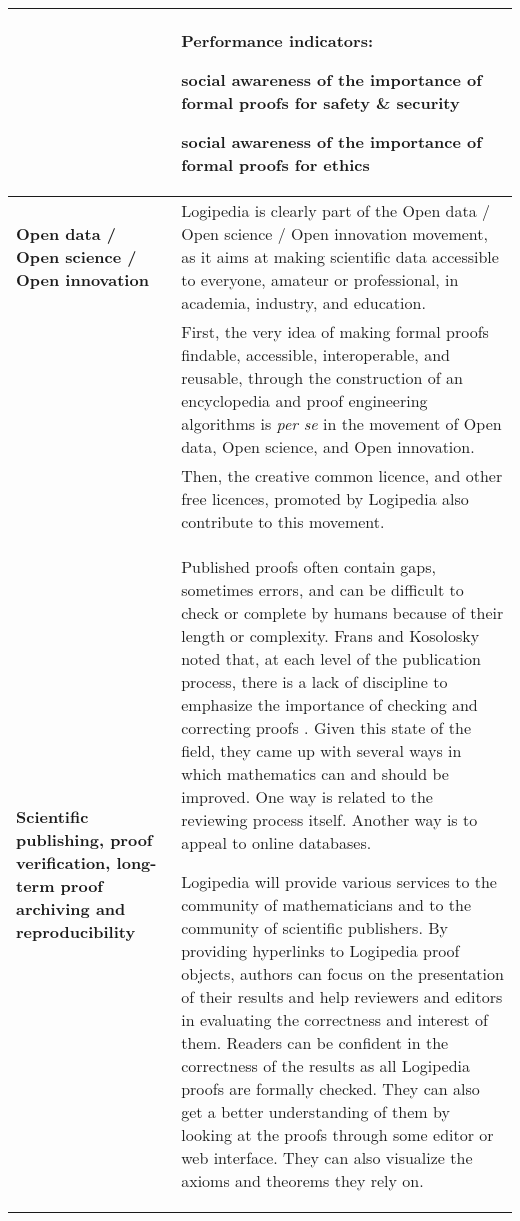 \begin{longtable}{|p{}|p{}|}
&
\colorbox{color2}{\bf Performance indicators:}
\begin{compactitem}
\item social awareness of the importance of formal proofs for safety \&
security
\item social awareness of the importance of formal proofs for ethics
\end{compactitem}
\\
\hline
{\bf Open data / Open science / Open innovation}
&
Logipedia is clearly part of the Open data / Open science / Open
innovation movement, as it aims at making scientific data accessible
to everyone, amateur or professional, in academia, industry, and
education.\\
&
\hspace{0.4cm}
First, the very idea of making formal proofs findable, accessible,
interoperable, and reusable, through the construction of an
encyclopedia and proof engineering algorithms is {\em per se} in the
movement of Open data, Open science, and Open innovation.\\
&
\hspace{0.4cm}
Then, the creative common licence, and other free licences, promoted by 
Logipedia also contribute to this movement.
\\
\hline
{\bf Scientific publishing, proof verification, long-term proof archiving and reproducibility}
&
Published proofs often contain gaps, sometimes errors, and can be difficult
to check or complete by humans because of their length or
complexity. Frans and Kosolosky noted that, at each level of the
publication process, there is a lack of discipline to emphasize the
importance of checking and correcting proofs
\cite{frans14theoria}. Given this state of the field, they came up
with several ways in which mathematics can and should be improved.
One way is related to the reviewing process itself. Another
way is to appeal to online databases.

\hspace{0.4cm}
Logipedia will provide various services to the community of
mathematicians and to the community of scientific publishers. By
providing hyperlinks to Logipedia proof objects, authors can focus on
the presentation of their results and help reviewers and editors in
evaluating the correctness and interest of them. Readers can be
confident in the correctness of the results as all Logipedia proofs
are formally checked. They can also get a better understanding of them
by looking at the proofs through some editor or web interface. They
can also visualize the axioms and theorems they rely on.


\end{longtable}
